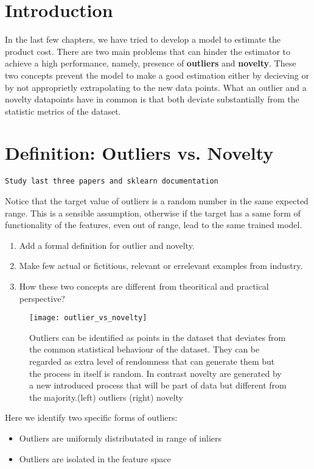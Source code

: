 \documentclass{article}
\begin{document}
\section{Introduction}

In the last few chapters, we have tried to develop a model to estimate the product cost. There are two main problems that can hinder the estimator to achieve a high performance, namely, presence of {\bf outliers} and {\bf novelty}. These two concepts prevent the model to make a good estimation either by decieving or by not approprietly extrapolating to the new data points. What an outlier and a novelty datapoints have in common is that both deviate substantially from the statistic metrics of the dataset. 

\section{Definition: Outliers vs. Novelty}

\texttt{Study last three papers and sklearn documentation}


Notice that the target value of outliers is a random number in the same expected range. This is a sensible assumption, otherwise if the target has a same form of functionality of the features, even out of range, lead to the same trained model.


\begin{enumerate}
\item Add a formal definition for outlier and novelty.
\item Make few actual or fictitious, relevant or errelevant examples from industry.
\item How these two concepts are different from theoritical and practical perspective?
\end{enumerate}

\begin{figure}[h]
  \texttt{[image: outlier\_vs\_novelty]}
    \caption{Outliers can be identified as points in the dataset that deviates from the common statistical behaviour of the dataset. They can be regarded as extra level of rendomness that can generate them but the process in itself is random. In contrast novelty are generated by a new introduced process that will be part of data but different from the majority.(left) outliers (right) novelty }
\end{figure}

Here we identify two specific forms of outliers:
\begin{itemize}  
\item Outliers are uniformly distributated in range of inliers
\item Outliers are isolated in the feature space
\end{itemize}
\end{document}
